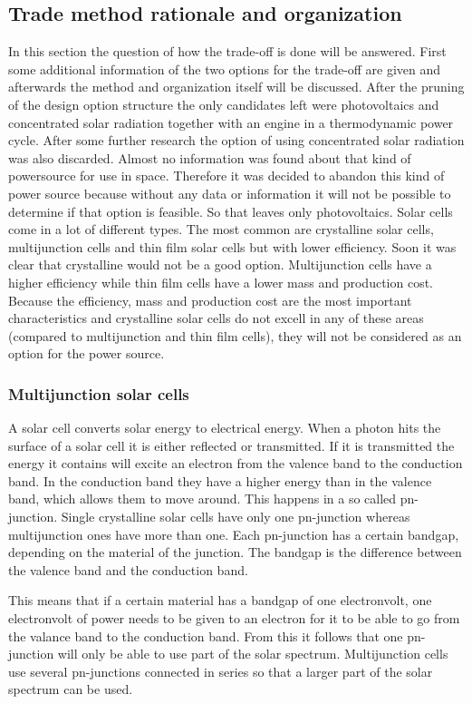 \subsection{Trade method rationale and organization}
In this section the question of how the trade-off is done will be answered. First some additional information of the two options for the trade-off
are given and afterwards the method and organization itself will be discussed.
After the pruning of the design option structure the only candidates left were photovoltaics and concentrated solar radiation together with an engine in a thermodynamic power cycle. 
After some further research the option of using concentrated solar radiation was also discarded. Almost no information was found about that
kind of powersource for use in space. Therefore it was decided to abandon this kind of power source because without any data or information 
it will not be possible to determine if that option is feasible. So that leaves only photovoltaics. 
Solar cells come in a lot of different types. The most common are crystalline solar cells, multijunction cells and thin film solar cells but with lower efficiency. Soon it was clear that crystalline would not be a good option. Multijunction cells have a higher efficiency while thin film cells have a lower mass and production cost. Because the efficiency, mass and production cost are the most important characteristics and crystalline solar cells do not excell in any of these areas (compared to multijunction and thin film cells), they will not be considered as an option for the power source.
 
\subsubsection{Multijunction solar cells}
A solar cell converts solar energy to electrical energy. When a photon hits the surface of a solar cell it is either reflected or transmitted.
If it is transmitted the energy it contains will excite an electron from the valence band to the conduction band. In the conduction band they have a higher energy than in the valence band, which allows them to move around. This happens in a so called pn-junction. Single crystalline solar cells have only one pn-junction whereas multijunction ones have more than one. Each pn-junction has a certain bandgap, depending on the material of the junction. The bandgap is the difference between the valence band and the conduction band.

This means that if a certain material has a bandgap of one electronvolt, one electronvolt of power needs to be given to an electron for it to be able to go from the valance band to the conduction band. From this it follows that one pn-junction will only be able to use part of the solar spectrum. Multijunction cells use several pn-junctions connected in series so that a larger part of the solar spectrum can be used.

